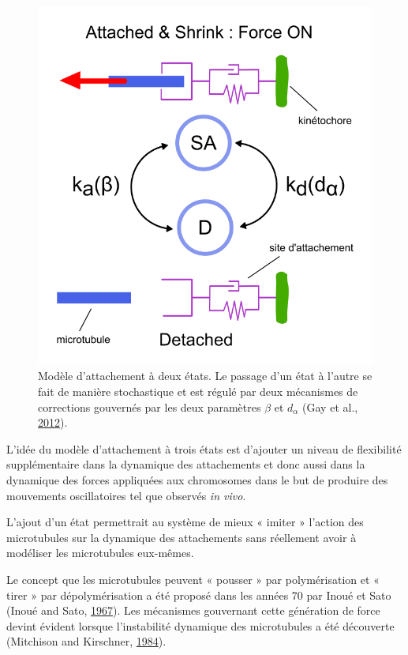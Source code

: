 \documentclass[12pt,a4paper,twoside,openright]{book}
\begin{document}
\begin{figure}[htbp]
\centering
\includegraphics{figures/results/modelling/two_states.png}
\caption[Modèle d'attachement à deux états]{\label{fig:two_states}Modèle
d'attachement à deux états. Le passage d'un état à l'autre se fait de
manière stochastique et est régulé par deux mécanismes de corrections
gouvernés par les deux paramètres \(\beta\) et \(d_\alpha\) (Gay et al.,
\hyperref[ref-Gay2012a]{2012}).}
\end{figure}

L'idée du modèle d'attachement à trois états est d'ajouter un niveau de
flexibilité supplémentaire dans la dynamique des attachements et donc
aussi dans la dynamique des forces appliquées aux chromosomes dans le
but de produire des mouvements oscillatoires tel que observés \emph{in
vivo}.

L'ajout d'un état permettrait au système de mieux « imiter » l'action
des microtubules sur la dynamique des attachements sans réellement avoir
à modéliser les microtubules eux-mêmes.

Le concept que les microtubules peuvent « pousser » par polymérisation
et « tirer » par dépolymérisation a été proposé dans les années 70 par
Inoué et Sato (Inoué and Sato, \hyperref[ref-Inoue1967]{1967}). Les
mécanismes gouvernant cette génération de force devint évident lorsque
l'instabilité dynamique des microtubules a été découverte (Mitchison and
Kirschner, \hyperref[ref-Mitchison1984]{1984}).
\end{document}
